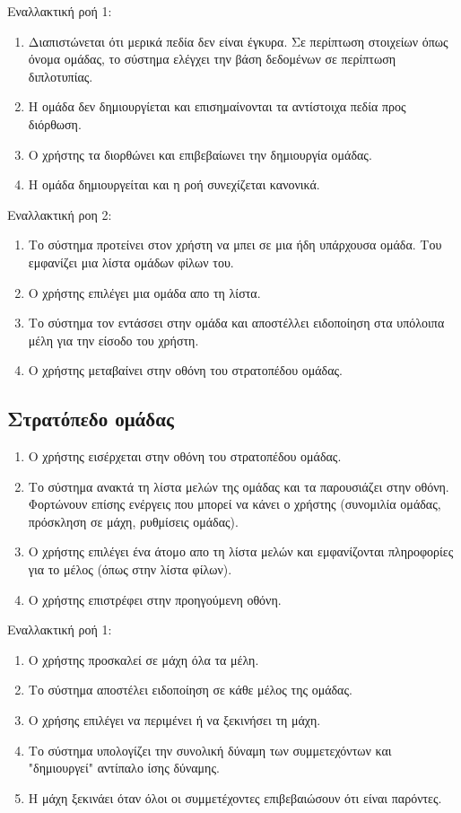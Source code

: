 Εναλλακτική ροή 1:
\begin{enumerate}[label=6.\alph*.,ref=6.\alph*]
\item Διαπιστώνεται ότι μερικά πεδία δεν είναι έγκυρα. Σε περίπτωση στοιχείων όπως όνομα ομάδας, το σύστημα ελέγχει την βάση δεδομένων σε περίπτωση διπλοτυπίας.
\item Η ομάδα δεν δημιουργίεται και επισημαίνονται τα αντίστοιχα πεδία προς διόρθωση. 
\item Ο χρήστης τα διορθώνει και επιβεβαίωνει την δημιουργία ομάδας.
\item Η ομάδα δημιουργείται και η ροή συνεχίζεται κανονικά.
\end{enumerate}

Εναλλακτική ροη 2:
\begin{enumerate}[label=3.\alph*.,ref=3.\alph*]
\item Το σύστημα προτείνει στον χρήστη να μπει σε μια ήδη υπάρχουσα ομάδα. Του εμφανίζει μια λίστα ομάδων φίλων του.
\item Ο χρήστης επιλέγει μια ομάδα απο τη λίστα.
\item Το σύστημα τον εντάσσει στην ομάδα και αποστέλλει ειδοποίηση στα υπόλοιπα μέλη για την είσοδο του χρήστη.
\item Ο χρήστης μεταβαίνει στην οθόνη του στρατοπέδου ομάδας.
\end{enumerate}

\newpage
\subsection{Στρατόπεδο ομάδας}
\label{sec:clanbase}
\begin{enumerate}
\item Ο χρήστης εισέρχεται στην οθόνη του στρατοπέδου ομάδας.
\item Το σύστημα ανακτά τη λίστα μελών της ομάδας και τα παρουσιάζει στην οθόνη. Φορτώνουν επίσης ενέργεις που μπορεί να κάνει ο χρήστης (συνομιλία ομάδας, πρόσκληση σε μάχη, ρυθμίσεις ομάδας).
\item Ο χρήστης επιλέγει ένα άτομο απο τη λίστα μελών και εμφανίζονται πληροφορίες για το μέλος (όπως στην λίστα φίλων).
\item Ο χρήστης επιστρέφει στην προηγούμενη οθόνη.
\end{enumerate}

Εναλλακτική ροή 1:
\begin{enumerate}[label=3.\alph*.,ref=3.\alph*]
\item Ο χρήστης προσκαλεί σε μάχη όλα τα μέλη.
\item Το σύστημα αποστέλει ειδοποίηση σε κάθε μέλος της ομάδας.
\item O χρήσης επιλέγει να περιμένει ή να ξεκινήσει τη μάχη.
\item Το σύστημα υπολογίζει την συνολική δύναμη των συμμετεχόντων και "δημιουργεί" αντίπαλο ίσης δύναμης.
\item Η μάχη ξεκινάει όταν όλοι οι συμμετέχοντες επιβεβαιώσουν ότι είναι παρόντες.
\end{enumerate}

